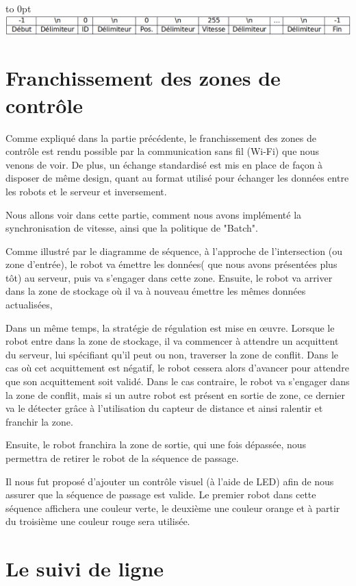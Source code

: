 \documentclass[french,a4paper,12pt]{report}
\begin{document}
\hfill\hbox to 0pt{\hss\includegraphics[width=15cm]{val2.png}\hss}\hfill\null\newline

\chapter{Franchissement des zones de contrôle}
Comme expliqué dans la partie précédente, le franchissement des zones de contrôle est rendu possible par la communication sans fil (Wi-Fi) que nous venons de voir. De plus, un échange standardisé est mis en place de façon à disposer de même design, quant au format utilisé pour échanger les données entre les robots et le serveur et inversement.

Nous allons voir dans cette partie, comment nous avons implémenté la synchronisation de vitesse, ainsi que la politique de "Batch".

Comme illustré par le diagramme de séquence, à l'approche de l'intersection (ou zone d'entrée), le robot va émettre les données( que nous avons présentées plus tôt) au serveur, puis va s'engager dans cette zone.
Ensuite, le robot va arriver dans la zone de stockage où il va à nouveau émettre les mêmes données actualisées,

Dans un même temps, la stratégie de régulation est mise en œuvre. Lorsque le robot entre dans la zone de stockage, il va commencer à attendre un acquittent du serveur, lui spécifiant qu'il peut ou non, traverser la zone de conflit. Dans le cas où cet acquittement est négatif, le robot cessera alors d'avancer pour attendre que son acquittement soit validé. Dans le cas contraire, le robot va s'engager dans la zone de conflit, mais si un autre robot est présent en sortie de zone, ce dernier va le détecter grâce à l'utilisation du capteur de distance et ainsi ralentir et franchir la zone.

Ensuite, le robot franchira la zone de sortie, qui une fois dépassée, nous permettra de retirer le robot de la séquence de passage.

Il nous fut proposé d'ajouter un contrôle visuel (à l'aide de LED) afin de nous assurer que la séquence de passage est valide. Le premier robot dans cette séquence affichera une couleur verte, le deuxième une couleur orange et à partir du troisième une couleur rouge sera utilisée.

\chapter{Le suivi de ligne} %
\end{document}
